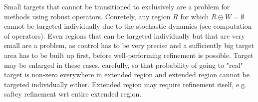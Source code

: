     Small targets that cannot be transitioned to exclusively are a problem for methods using robust operators.
    Conretely, any region $R$ for which $R \ominus W = \emptyset$ cannot be targeted individually due to the stochastic dynamics (see computation of operators).
    Even regions that can be targeted individually but that are very small are a problem, as control has to be very precise and a sufficiently big target area has to be built up first, before well-performing refinement is possible.
    Target may be enlarged in these cases, carefully, so that probability of going to "real" target is non-zero everywhere in extended region and extended region cannot be targeted individually either.
    Extended region may require refinement itself, e.g. saftey refinement wrt entire extended region.

\stopsubsection

